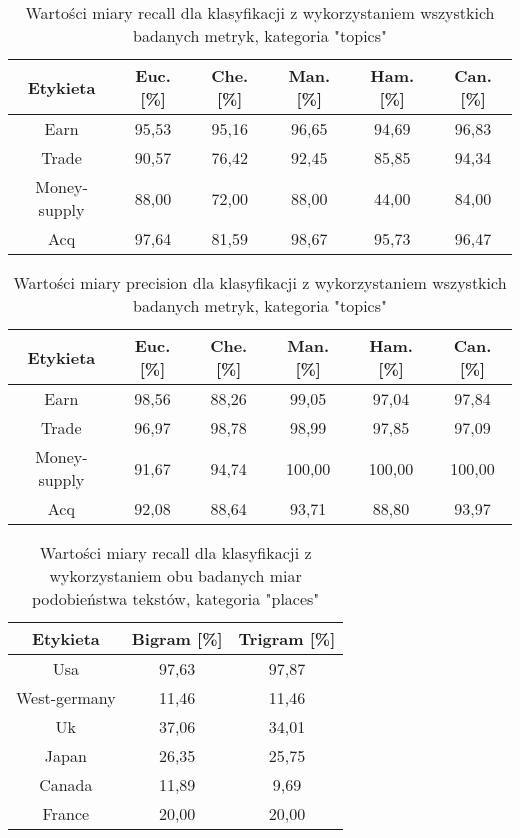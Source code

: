 \documentclass{classrep}
\begin{document}
\begin{table}[H]
	\centering
	\begin{tabular}{c c c c c c} 
		\hline
		\textbf{Etykieta} & \textbf{Euc.  [\%]} & \textbf{Che.  [\%]} & \textbf{Man.  [\%]} & \textbf{Ham.  [\%]} & \textbf{Can.  [\%]} \\ [0.5ex] 
		\hline
		\hline 
Earn	&	95,53	&	95,16	&	96,65	&	94,69	&	96,83	\\
Trade	&	90,57	&	76,42	&	92,45	&	85,85	&	94,34	\\
Money-supply	&	88,00	&	72,00	&	88,00	&	44,00	&	84,00	\\
Acq	&	97,64	&	81,59	&	98,67	&	95,73	&	96,47	\\
		\hline
	\end{tabular}
	\caption{Wartości miary recall dla klasyfikacji z wykorzystaniem wszystkich badanych metryk, kategoria "topics"}
\end{table}

\begin{table}[H]
	\centering
	\begin{tabular}{c c c c c c} 
		\hline
		\textbf{Etykieta} & \textbf{Euc.  [\%]} & \textbf{Che.  [\%]} & \textbf{Man.  [\%]} & \textbf{Ham.  [\%]} & \textbf{Can.  [\%]} \\ [0.5ex] 
		\hline
		\hline 
Earn	&	98,56	&	88,26	&	99,05	&	97,04	&	97,84	\\
Trade	&	96,97	&	98,78	&	98,99	&	97,85	&	97,09	\\
Money-supply	&	91,67	&	94,74	&	100,00	&	100,00	&	100,00	\\
Acq	&	92,08	&	88,64	&	93,71	&	88,80	&	93,97	\\
		\hline
	\end{tabular}
	\caption{Wartości miary precision dla klasyfikacji z wykorzystaniem wszystkich badanych metryk, kategoria "topics"}
\end{table}

\begin{table}[H]
	\centering
	\begin{tabular}{c c c} 
		\hline
		\textbf{Etykieta} & \textbf{Bigram  [\%]} & \textbf{Trigram  [\%]} \\ [0.5ex] 
		\hline
		\hline 
Usa	&	97,63	&	97,87	\\
West-germany	&	11,46	&	11,46	\\
Uk	&	37,06	&	34,01	\\
Japan	&	26,35	&	25,75	\\
Canada	&	11,89	&	9,69	\\
France	&	20,00	&	20,00	\\
		\hline
	\end{tabular}
	\caption{Wartości miary recall dla klasyfikacji z wykorzystaniem obu badanych miar podobieństwa tekstów, kategoria "places"}
\end{table}
\end{document}
